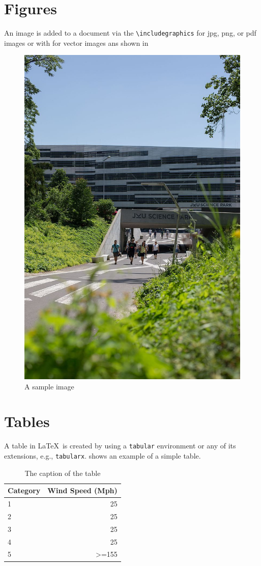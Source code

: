 \section{Figures}

An image is added to a document via the \verb|\includegraphics| for jpg, png, or pdf images  or with \verb|| for vector images ans shown in 

\begin{figure}[ht!]
\centering
  \includegraphics[width=0.25\linewidth]{figures/sciencepark.jpg}
  \caption{A sample image}
  \label{fig:sample-fig}
\end{figure}


\section{Tables}



A table in \LaTeX\ is created by using a \verb|tabular| environment or any of its extensions, e.g., \verb|tabularx|.
 shows an example of a simple table.

\begin{table}[th!]
\centering
\begin{tabular}{p{4cm}r}
\toprule
Category                & Wind	Speed (Mph)             \\ \midrule
1                       & 25                            \\
2                       & 25                            \\
3                       & 25                            \\ \midrule
4                       & 25                            \\
5                       & \textgreater{}=155           \\ \bottomrule
\end{tabular}
 \caption{The caption of the table}\label{tab:example}
\end{table}

